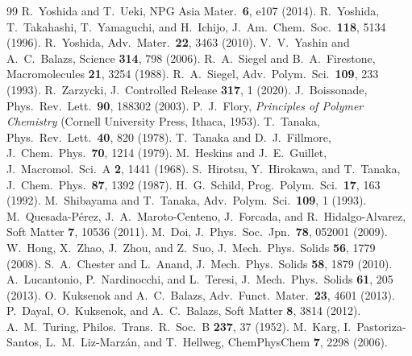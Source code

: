\documentclass[aps,pre,reprint,superscriptaddress,longbibliography,floatfix]{revtex4-2}
\begin{document}
\begin{thebibliography}{99}
 R.~Yoshida and T.~Ueki, NPG Asia Mater.\ \textbf{6}, e107 (2014).
 R.~Yoshida, T.~Takahashi, T.~Yamaguchi, and H.~Ichijo, J.~Am.\ Chem.\ Soc.\ \textbf{118}, 5134 (1996).
 R.~Yoshida, Adv.\ Mater.\ \textbf{22}, 3463 (2010).
 V.~V.~Yashin and A.~C.~Balazs, Science \textbf{314}, 798 (2006).
 R.~A.~Siegel and B.~A.~Firestone, Macromolecules \textbf{21}, 3254 (1988).
 R.~A.~Siegel, Adv.\ Polym.\ Sci.\ \textbf{109}, 233 (1993).
 R.~Zarzycki, J.\ Controlled Release \textbf{317}, 1 (2020).
 J.~Boissonade, Phys.\ Rev.\ Lett.\ \textbf{90}, 188302 (2003).
 P.~J.~Flory, \textit{Principles of Polymer Chemistry} (Cornell University Press, Ithaca, 1953).
 T.~Tanaka, Phys.\ Rev.\ Lett.\ \textbf{40}, 820 (1978).
 T.~Tanaka and D.~J.~Fillmore, J.\ Chem.\ Phys.\ \textbf{70}, 1214 (1979).
 M.~Heskins and J.~E.~Guillet, J.\ Macromol.\ Sci.\ A \textbf{2}, 1441 (1968).
 S.~Hirotsu, Y.~Hirokawa, and T.~Tanaka, J.\ Chem.\ Phys.\ \textbf{87}, 1392 (1987).
 H.~G.~Schild, Prog.\ Polym.\ Sci.\ \textbf{17}, 163 (1992).
 M.~Shibayama and T.~Tanaka, Adv.\ Polym.\ Sci.\ \textbf{109}, 1 (1993).
 M.~Quesada-P\'erez, J.~A.~Maroto-Centeno, J.~Forcada, and R.~Hidalgo-Alvarez, Soft Matter \textbf{7}, 10536 (2011).
 M.~Doi, J.\ Phys.\ Soc.\ Jpn.\ \textbf{78}, 052001 (2009).
 W.~Hong, X.~Zhao, J.~Zhou, and Z.~Suo, J.\ Mech.\ Phys.\ Solids \textbf{56}, 1779 (2008).
 S.~A.~Chester and L.~Anand, J.\ Mech.\ Phys.\ Solids \textbf{58}, 1879 (2010).
 A.~Lucantonio, P.~Nardinocchi, and L.~Teresi, J.\ Mech.\ Phys.\ Solids \textbf{61}, 205 (2013).
 O.~Kuksenok and A.~C.~Balazs, Adv.\ Funct.\ Mater.\ \textbf{23}, 4601 (2013).
 P.~Dayal, O.~Kuksenok, and A.~C.~Balazs, Soft Matter \textbf{8}, 3814 (2012).
 A.~M.~Turing, Philos.\ Trans.\ R.\ Soc.\ B \textbf{237}, 37 (1952).
 M.~Karg, I.~Pastoriza-Santos, L.~M.~Liz-Marz\'an, and T.~Hellweg, ChemPhysChem \textbf{7}, 2298 (2006).
\end{thebibliography}

\appendix

\end{document}

